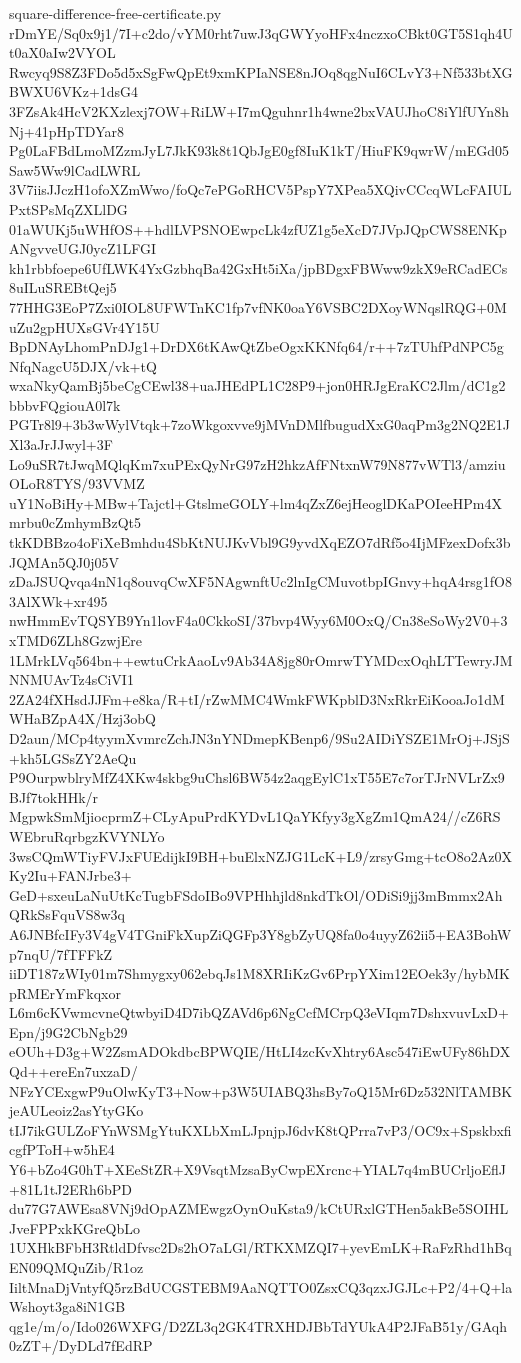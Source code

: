 \documentclass[11pt]{article}
\theoremstyle{definition}
\theoremstyle{remark}
\begin{document}
\begin{filecontents*}[overwrite]{square-difference-free-certificate.py}
rDmYE/Sq0x9j1/7I+c2do/vYM0rht7uwJ3qGWYyoHFx4nczxoCBkt0GT5S1qh4Ut0aX0aIw2VYOL
Rwcyq9S8Z3FDo5d5xSgFwQpEt9xmKPIaNSE8nJOq8qgNuI6CLvY3+Nf533btXGBWXU6VKz+1dsG4
3FZsAk4HcV2KXzlexj7OW+RiLW+I7mQguhnr1h4wne2bxVAUJhoC8iYlfUYn8hNj+41pHpTDYar8
Pg0LaFBdLmoMZzmJyL7JkK93k8t1QbJgE0gf8IuK1kT/HiuFK9qwrW/mEGd05Saw5Ww9lCadLWRL
3V7iisJJczH1ofoXZmWwo/foQc7ePGoRHCV5PspY7XPea5XQivCCcqWLcFAIULPxtSPsMqZXLlDG
01aWUKj5uWHfOS++hdlLVPSNOEwpcLk4zfUZ1g5eXcD7JVpJQpCWS8ENKpANgvveUGJ0ycZ1LFGI
kh1rbbfoepe6UfLWK4YxGzbhqBa42GxHt5iXa/jpBDgxFBWww9zkX9eRCadECs8uILuSREBtQej5
77HHG3EoP7Zxi0IOL8UFWTnKC1fp7vfNK0oaY6VSBC2DXoyWNqslRQG+0MuZu2gpHUXsGVr4Y15U
BpDNAyLhomPnDJg1+DrDX6tKAwQtZbeOgxKKNfq64/r++7zTUhfPdNPC5gNfqNagcU5DJX/vk+tQ
wxaNkyQamBj5beCgCEwl38+uaJHEdPL1C28P9+jon0HRJgEraKC2Jlm/dC1g2bbbvFQgiouA0l7k
PGTr8l9+3b3wWylVtqk+7zoWkgoxvve9jMVnDMlfbugudXxG0aqPm3g2NQ2E1JXl3aJrJJwyl+3F
Lo9uSR7tJwqMQlqKm7xuPExQyNrG97zH2hkzAfFNtxnW79N877vWTl3/amziuOLoR8TYS/93VVMZ
uY1NoBiHy+MBw+Tajctl+GtslmeGOLY+lm4qZxZ6ejHeoglDKaPOIeeHPm4Xmrbu0cZmhymBzQt5
tkKDBBzo4oFiXeBmhdu4SbKtNUJKvVbl9G9yvdXqEZO7dRf5o4IjMFzexDofx3bJQMAn5QJ0j05V
zDaJSUQvqa4nN1q8ouvqCwXF5NAgwnftUc2lnIgCMuvotbpIGnvy+hqA4rsg1fO83AlXWk+xr495
nwHmmEvTQSYB9Yn1lovF4a0CkkoSI/37bvp4Wyy6M0OxQ/Cn38eSoWy2V0+3xTMD6ZLh8GzwjEre
1LMrkLVq564bn++ewtuCrkAaoLv9Ab34A8jg80rOmrwTYMDcxOqhLTTewryJMNNMUAvTz4sCiVI1
2ZA24fXHsdJJFm+e8ka/R+tI/rZwMMC4WmkFWKpblD3NxRkrEiKooaJo1dMWHaBZpA4X/Hzj3obQ
D2aun/MCp4tyymXvmrcZchJN3nYNDmepKBenp6/9Su2AIDiYSZE1MrOj+JSjS+kh5LGSsZY2AeQu
P9OurpwblryMfZ4XKw4skbg9uChsl6BW54z2aqgEylC1xT55E7c7orTJrNVLrZx9BJf7tokHHk/r
MgpwkSmMjiocprmZ+CLyApuPrdKYDvL1QaYKfyy3gXgZm1QmA24//cZ6RSWEbruRqrbgzKVYNLYo
3wsCQmWTiyFVJxFUEdijkI9BH+buElxNZJG1LcK+L9/zrsyGmg+tcO8o2Az0XKy2Iu+FANJrbe3+
GeD+sxeuLaNuUtKcTugbFSdoIBo9VPHhhjld8nkdTkOl/ODiSi9jj3mBmmx2AhQRkSsFquVS8w3q
A6JNBfcIFy3V4gV4TGniFkXupZiQGFp3Y8gbZyUQ8fa0o4uyyZ62ii5+EA3BohWp7nqU/7fTFFkZ
iiDT187zWIy01m7Shmygxy062ebqJs1M8XRIiKzGv6PrpYXim12EOek3y/hybMKpRMErYmFkqxor
L6m6cKVwmcvneQtwbyiD4D7ibQZAVd6p6NgCcfMCrpQ3eVIqm7DshxvuvLxD+Epn/j9G2CbNgb29
eOUh+D3g+W2ZsmADOkdbcBPWQIE/HtLI4zcKvXhtry6Asc547iEwUFy86hDXQd++ereEn7uxzaD/
NFzYCExgwP9uOlwKyT3+Now+p3W5UIABQ3hsBy7oQ15Mr6Dz532NlTAMBKjeAULeoiz2asYtyGKo
tIJ7ikGULZoFYnWSMgYtuKXLbXmLJpnjpJ6dvK8tQPrra7vP3/OC9x+SpskbxficgfPToH+w5hE4
Y6+bZo4G0hT+XEeStZR+X9VsqtMzsaByCwpEXrcnc+YIAL7q4mBUCrljoEflJ+81L1tJ2ERh6bPD
du77G7AWEsa8VNj9dOpAZMEwgzOynOuKsta9/kCtURxlGTHen5akBe5SOIHLJveFPPxkKGreQbLo
1UXHkBFbH3RtldDfvsc2Ds2hO7aLGl/RTKXMZQI7+yevEmLK+RaFzRhd1hBqEN09QMQuZib/R1oz
IiltMnaDjVntyfQ5rzBdUCGSTEBM9AaNQTTO0ZsxCQ3qzxJGJLc+P2/4+Q+laWshoyt3ga8iN1GB
qg1e/m/o/Ido026WXFG/D2ZL3q2GK4TRXHDJBbTdYUkA4P2JFaB51y/GAqh0zZT+/DyDLd7fEdRP

\end{filecontents*}
\end{document}
